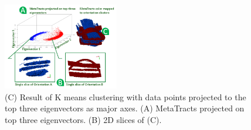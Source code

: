 \begin{figure}[tb]
  \centering
%  	
 \includegraphics[width=0.45\textwidth]{imagesMT2014/crop-16/orientation_cluster.PNG}
  	\caption{(C) Result of K means clustering with data points projected to the top three eigenvectors as major axes. (A) MetaTracts projected on top three eigenvectors. (B) 2D slices of (C). }
  \label{fig:orientation_clustering}
  \end{figure}

